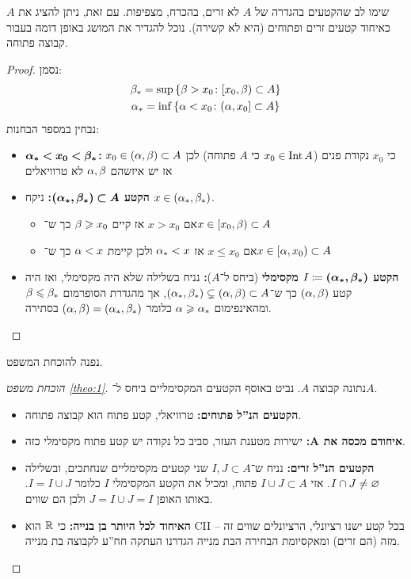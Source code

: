 \documentclass[name=רשימות פונקציות ממשיות – WIP]{../../../tex/classes/noChapterMegasumPreamble}
\begin{document}
	שימו לב שהקטעים בהגדרה של $A$ לא זרים, בהכרח, מצפיפות. עם זאת, ניתן להציג את $A$ כאיחוד קטעים זרים ופתוחים (היא לא קשירה). 
	נוכל להגדיר את המושג באופן דומה בעבור קבוצה פתוחה. 
	\begin{proof}
		נסמן: 
		\begin{gather*}
			\beta_* = \sup\left \{ \beta > x_0 \colon [x_0, \beta) \subset A \right \} \\
			\alpha_* = \inf\left \{ \alpha < x_0 \colon (\alpha, x_0] \subset A \right \}
		\end{gather*}
		נבחין במספר הבחנות: 
		\begin{itemize}
			\item $\bm{\alpha_* < x_0 < \beta_*}$\textbf{: }כי $x_0$ נקודת פנים ($x_0 \in \operatorname{Int} A$ כי $A$ פתוחה) לכן $x_0 \in (\alpha, \beta) \subset A$ אז יש איזשהם $\alpha, \beta$ לא טרוויאלים
			\item \textbf{הקטע }$\bm{(\alpha_*, \beta_*) \subset A}$\textbf{: }ניקח $x \in (\alpha_*, \beta_*)$. 
			\begin{itemize}
				\item אם $x > x_0$ אז קיים $\beta \geqslant x_0$ כך ש־$x \in [x_0, \beta) \subset A$
				\item אם $x \le x_0$ אז $\alpha_* < x$ ולכן קיימת $\alpha < x$ כך ש־$x \in [\alpha, x_0) \subset A$
			\end{itemize}
			\item \textbf{הקטע $I \coloneqq \bm{(\alpha_*, \beta_*)}$ מקסימלי} (ביחס ל־$A$)\textbf{: }נניח בשלילה שלא היה מקסימלי, ואז היה קטע $(\alpha, \beta)$ כך ש־$(\alpha_*, \beta_*) \subsetneq (\alpha, \beta) \subset A$, אך מהגדרת הסופרמום $\beta \leqslant \beta_*$ ומהאינפימום $\alpha \geqslant \alpha_*$ כלומר $(\alpha, \beta) =(\alpha_*, \beta_*)$ בסתירה. 
		\end{itemize}
	\end{proof}
	נפנה להוכחת המשפט. 
	\begin{proof}[הוכחת משפט \ref{theo:1}]
		 נתונה קבוצה $A$. נביט באוסף הקטעים המקסימליים ביחס ל־$A$. 
		 \begin{itemize}
		 	\item \textbf{הקטעים הנ''ל פתוחים: }טרוויאלי, קטע פתוח הוא קבוצה פתוחה. 
		 	\item \textbf{איחודם מכסה את $\bm{A}$: }ישירות מטענת העזר, סביב כל נקודה יש קטע פתוח מקסימלי כזה. 
		 	\item \textbf{הקטעים הנ''ל זרים: }נניח ש־$I, J \subset A$ שני קטעים מקסימליים שנחתכים, ובשלילה $I \cap J \neq \varnothing$. אזי $I \cup J \subset A$ פתוח, ומכיל את הקטע המקסימלי $I$ כלומר $I = I \cup J$. באותו האופן $J = I \cup J = I$ ולכן הם שווים. 
		 	\item \textbf{האיחוד לכל היותר בן בנייה: }כי $\mathbb{R}$ הוא CII – בכל קטע ישנו רציונלי, הרציונלים שווים זה מזה (הם זרים) ומאקסיומת הבחירה הבת מנייה הגדרנו העתקה חח''ע לקבוצה בת מנייה. 
		 \end{itemize}\envendproof
	\end{proof}
\end{document}
